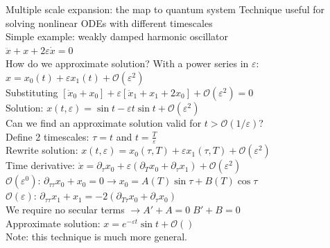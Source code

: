 \documentclass[usepdftitle=false]{beamer}
\newcommand{\xd}{\dot{x}}
\newcommand{\xdd}{\ddot{x}}
\newcommand{\bigO}{\mathcal{O}}
\begin{document}
\begin{frame}{Multiple scale expansion: the map to quantum system}
    Technique useful for solving nonlinear ODEs with different timescales \\
    \vspace{0.5cm}
    Simple example: weakly damped harmonic oscillator \\ $\xdd + x +2\varepsilon\xd =0$ \\
    \vspace{0.5cm}
    How do we approximate solution? With a power series in $\varepsilon$: \\ 
    $x = x_0(t) + \varepsilon x_1(t) + \bigO(\varepsilon^2)$ \\
    \vspace{0.5cm}
    Substituting $[\xdd_0+x_0]+\varepsilon[\xdd_1+x_1+2x_0]+\bigO(\varepsilon^2)=0$ \\
    \vspace{0.2cm}
    Solution: $x(t,\varepsilon) = \sin{t} -\varepsilon t\sin{t}+\bigO(\varepsilon^2)$ \\
    \framebreak
    Can we find an approximate solution valid for $t>\bigO(1/\varepsilon)$? \\
    \vspace{0.2cm}
    Define 2 timescales: $\tau=t$ and $t=\frac{T}{\varepsilon}$ \\
    \vspace{0.2cm}
    Rewrite solution: $x(t,\varepsilon)=x_0(\tau,T)+\varepsilon x_1(\tau,T)+\bigO(\varepsilon^2)$ \\
    \vspace{0.2cm}
    Time derivative: $\xd = \partial_\tau x_0+\varepsilon(\partial_T x_0+\partial_\tau x_1)+\bigO(\varepsilon^2)$ \\
    \vspace{0.2cm}
    $\bigO(\varepsilon^0)$: $\partial_{\tau\tau}x_0+x_0=0\longrightarrow x_0=A(T)\sin{\tau}+B(T)\cos{\tau}$ \\
    \vspace{0.1cm}
    $\bigO(\varepsilon)$: $\partial_{\tau\tau}x_1+x_1=-2(\partial_{T\tau}x_0+\partial_\tau x_0)$ \\
    \vspace{0.2cm}
    We require no secular terms $\longrightarrow A'+A=0\; B'+B =0$ \\
    \vspace{0.3cm}
    Approximate solution: $x = e^{-\varepsilon t}\sin{t} +\bigO()$ \\
    \vspace{0.3cm}
    Note: this technique is much more general.
\end{frame}
\end{document}
